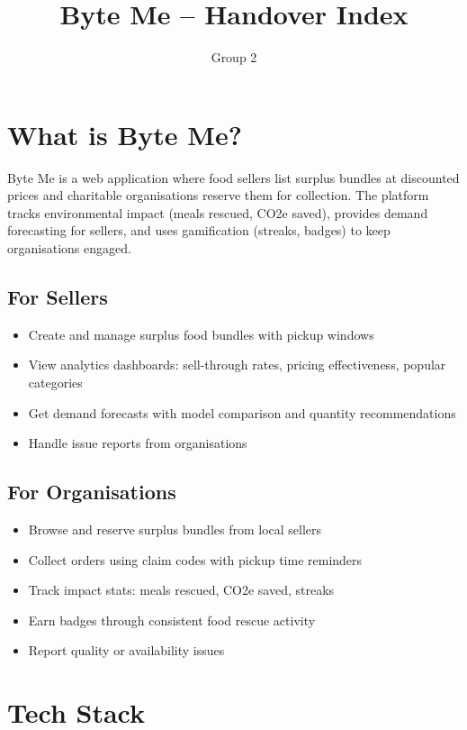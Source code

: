 \documentclass[a4paper,11pt]{article}
\title{Byte Me -- Handover Index}
\author{Group 2}
\date{}
\begin{document}
\maketitle

\section{What is Byte Me?}

Byte Me is a web application where food sellers list surplus bundles at discounted prices and charitable organisations reserve them for collection. The platform tracks environmental impact (meals rescued, CO2e saved), provides demand forecasting for sellers, and uses gamification (streaks, badges) to keep organisations engaged.

\subsection{For Sellers}

\begin{itemize}
  \item Create and manage surplus food bundles with pickup windows
  \item View analytics dashboards: sell-through rates, pricing effectiveness, popular categories
  \item Get demand forecasts with model comparison and quantity recommendations
  \item Handle issue reports from organisations
\end{itemize}

\subsection{For Organisations}

\begin{itemize}
  \item Browse and reserve surplus bundles from local sellers
  \item Collect orders using claim codes with pickup time reminders
  \item Track impact stats: meals rescued, CO2e saved, streaks
  \item Earn badges through consistent food rescue activity
  \item Report quality or availability issues
\end{itemize}

\section{Tech Stack}
\end{document}
